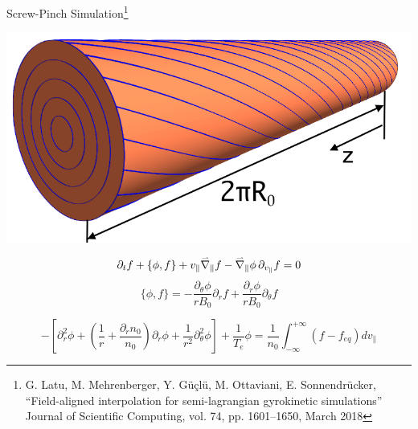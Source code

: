 \documentclass{beamer}
\newcommand{\hvv}[1]{\accentset{\rightharpoonup}{#1}}
\newcommand{\grad}{\ensuremath{\hvv{\nabla}}}
\begin{document}
\begin{frame}{Screw-Pinch Simulation\footnote{G. Latu, M. Mehrenberger, Y. Güçlü, M. Ottaviani, E. Sonnendrücker, “Field-aligned interpolation for semi-lagrangian gyrokinetic simulations” Journal of Scientific Computing, vol. 74, pp. 1601–1650, March 2018}}
\begin{minipage}{.45\textwidth}
 \includegraphics[width=\textwidth]{geometry_screw_pinch.png}
\end{minipage}
\begin{minipage}{.5\textwidth}
 \begin{equation*}
 \partial_t f + \{\phi,f\} + v_\parallel \grad_\parallel f - \grad_\parallel\phi\,  \partial_{v_\parallel} f=0
\end{equation*}
\begin{equation*}
 \{\phi,f\}=-\frac{\partial_\theta\phi}{rB_0}\partial_r f + \frac{\partial_r\phi}{rB_0}\partial_\theta f
\end{equation*}
\end{minipage}

\vspace{1em}
\begin{equation*}
 -\left[\partial_r^2\phi + \left(\frac{1}{r}+\frac{\partial_rn_0}{n_0}\right)\partial_r\phi+\frac{1}{r^2}\partial_\theta^2\phi\right]+\frac{1}{T_e}\phi = \frac{1}{n_0}\int_{-\infty}^{+\infty}(f-f_{eq})dv_\parallel
\end{equation*}
\end{frame}
\end{document}
